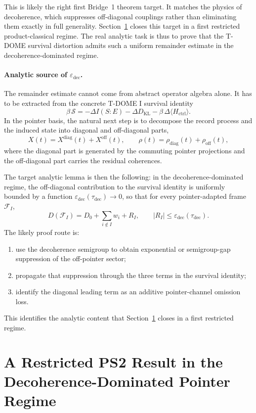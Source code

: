 \documentclass[12pt]{article}
\theoremstyle{definition}
\theoremstyle{remark}
\begin{document}
This is likely the right first Bridge~1 theorem target. It matches the
physics of decoherence, which suppresses off-diagonal couplings rather
than eliminating them exactly in full generality.
Section~\ref{sec:ps2model} closes this target in a first restricted
product-classical regime. The real analytic task is thus to prove that
the T-DOME survival distortion admits such a uniform remainder estimate
in the decoherence-dominated regime.

\paragraph{Analytic source of \(\varepsilon_{\mathrm{dec}}\).}
The remainder estimate cannot come from abstract operator algebra alone.
It has to be extracted from the concrete T-DOME I survival identity
\[
\beta\,\mathcal S
=
-\Delta I(S{:}E)
-\Delta D_{\mathrm{KL}}
-\beta\,\Delta\langle H_{\mathrm{ctrl}}\rangle.
\]
In the pointer basis, the natural next step is to decompose the record
process and the induced state into diagonal and off-diagonal parts,
\[
X(t)=X^{\mathrm{diag}}(t)+X^{\mathrm{off}}(t),
\qquad
\rho(t)=\rho_{\mathrm{diag}}(t)+\rho_{\mathrm{off}}(t),
\]
where the diagonal part is generated by the commuting pointer
projections and the off-diagonal part carries the residual coherences.

The target analytic lemma is then the following: in the
decoherence-dominated regime, the off-diagonal contribution to the
survival identity is uniformly bounded by a function
\(\varepsilon_{\mathrm{dec}}(\tau_{\mathrm{dec}})\to 0\), so that for
every pointer-adapted frame \(\mathcal F_I\),
\[
D(\mathcal F_I)
=
D_0+\sum_{i\notin I} w_i + R_I,
\qquad
|R_I|\le \varepsilon_{\mathrm{dec}}(\tau_{\mathrm{dec}}).
\]
The likely proof route is:
\begin{enumerate}
\item use the decoherence semigroup to obtain exponential or
  semigroup-gap suppression of the off-pointer sector;
\item propagate that suppression through the three terms in the survival
  identity;
\item identify the diagonal leading term as an additive pointer-channel
  omission loss.
\end{enumerate}
This identifies the analytic content that
Section~\ref{sec:ps2model} closes in a first restricted regime.

\section{A Restricted PS2 Result in the Decoherence-Dominated Pointer Regime}\label{sec:ps2model}
\end{document}
